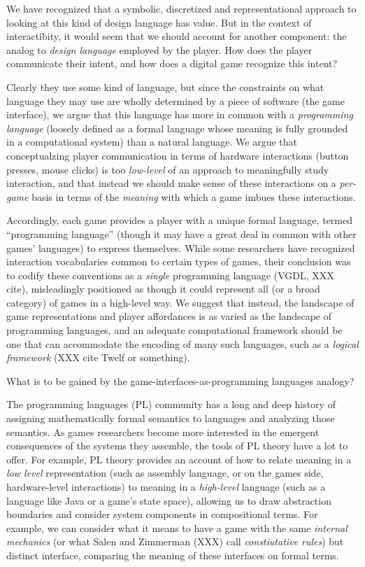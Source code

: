 \documentclass[sigconf]{acmart}
\begin{document}
We have recognized that a symbolic, discretized and representational
approach to looking at this kind of design language has value. But in the
context of interactibity, it would seem that we should account for another
component: the analog to {\em design language} employed by the
player. How does the player communicate their intent, and how does a
digital game recognize this intent?

Clearly they use some kind of language, but since the constraints on what
language they may use are wholly determined by a piece of software (the
game interface), we argue that this language has more in common with a {\em
programming language} (loosely defined as a formal language whose meaning
is fully grounded in a computational system) than a natural language. We
argue that conceptualzing player communication in terms of hardware
interactions (button presses, mouse clicks) is too {\em low-level} of an
approach to meaningfully study interaction, and that instead we should make
sense of these interactions on a {\em per-game} basis in terms of the {\em
meaning} with which a game imbues these interactions. 

Accordingly, each game provides a player with a unique formal language,
termed ``programming language'' (though it may have a great deal in common
with other games' languages) to express themselves. While some researchers
have recognized interaction vocabularies common to certain types of games,
their conclusion was to codify these conventions as a {\em single}
programming language (VGDL, XXX cite), misleadingly positioned as though it
could represent all (or a broad category) of games in a high-level way.
We suggest that instead, the landscape of game representations and player
affordances is as varied as the landscape of programming languages, and an
adequate computational framework should be one that can accommodate the
encoding of many such languages, such as a {\em logical framework} (XXX
cite Twelf or something).

What is to be gained by the game-interfaces-as-programming languages analogy?

The programming languages (PL) community has a long and deep history of
assigning mathematically formal semantics to languages and analyzing those
semantics. As games researchers become more interested in the emergent
consequences of the systems they assemble, the tools of PL theory have a
lot to offer. For example, PL theory provides an account of how to relate
meaning in a {\em low level} representation (such as assembly language, or
on the games side, hardware-level interactions) to meaning in a {\em
high-level} language (such as a language like Java or a game's state
space), allowing us to draw abstraction boundaries and consider system
components in compositional terms. For example, we can consider what it
means to have a game with the same {\em internal mechanics} (or what Salen
and Zimmerman (XXX) call {\em constiutative rules}) but distinct interface,
comparing the meaning of these interfaces on formal terms.
\end{document}
